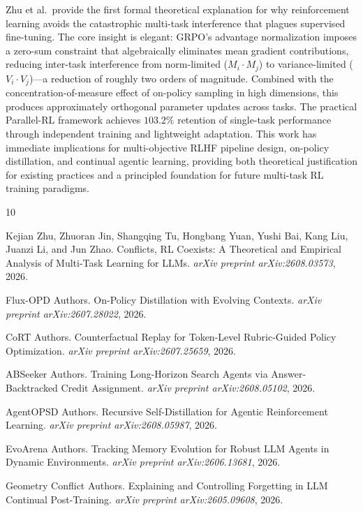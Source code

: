 \documentclass[11pt,a4paper]{article}
\begin{document}
Zhu et al.\ provide the first formal theoretical explanation for why reinforcement learning avoids the catastrophic multi-task interference that plagues supervised fine-tuning. The core insight is elegant: GRPO's advantage normalization imposes a zero-sum constraint that algebraically eliminates mean gradient contributions, reducing inter-task interference from norm-limited ($M_i \cdot M_j$) to variance-limited ($V_i \cdot V_j$)---a reduction of roughly two orders of magnitude. Combined with the concentration-of-measure effect of on-policy sampling in high dimensions, this produces approximately orthogonal parameter updates across tasks. The practical Parallel-RL framework achieves $103.2\%$ retention of single-task performance through independent training and lightweight adaptation. This work has immediate implications for multi-objective RLHF pipeline design, on-policy distillation, and continual agentic learning, providing both theoretical justification for existing practices and a principled foundation for future multi-task RL training paradigms.


\begin{thebibliography}{10}

Kejian Zhu, Zhuoran Jin, Shangqing Tu, Hongbang Yuan, Yushi Bai, Kang Liu, Juanzi Li, and Jun Zhao.
 Conflicts, {RL} Coexists: A Theoretical and Empirical Analysis of Multi-Task Learning for {LLMs}.
\newblock \emph{arXiv preprint arXiv:2608.03573}, 2026.

Flux-{OPD} Authors.
\newblock On-Policy Distillation with Evolving Contexts.
\newblock \emph{arXiv preprint arXiv:2607.28022}, 2026.

{CoRT} Authors.
\newblock Counterfactual Replay for Token-Level Rubric-Guided Policy Optimization.
\newblock \emph{arXiv preprint arXiv:2607.25659}, 2026.

{ABSeeker} Authors.
\newblock Training Long-Horizon Search Agents via Answer-Backtracked Credit Assignment.
\newblock \emph{arXiv preprint arXiv:2608.05102}, 2026.

{AgentOPSD} Authors.
\newblock Recursive Self-Distillation for Agentic Reinforcement Learning.
\newblock \emph{arXiv preprint arXiv:2608.05987}, 2026.

{EvoArena} Authors.
\newblock Tracking Memory Evolution for Robust {LLM} Agents in Dynamic Environments.
\newblock \emph{arXiv preprint arXiv:2606.13681}, 2026.

Geometry Conflict Authors.
\newblock Explaining and Controlling Forgetting in {LLM} Continual Post-Training.
\newblock \emph{arXiv preprint arXiv:2605.09608}, 2026.

\end{thebibliography}
\end{document}
